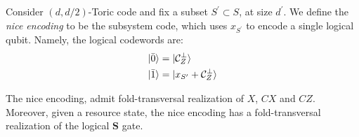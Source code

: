 \begin{definition}
  Consider $(d,d/2)$-Toric code and fix a subset $S^{\prime} \subset S$, at size $d^{\prime}$. We define the \textit{nice encoding} to be the subsystem code, which uses $x_{S^{\prime}}$ to encode a single logical qubit. Namely, the logical codewords are: 
  \begin{equation*}
    \begin{split}
      \ket{ \bar{0} } &= \ket{ \mathcal{C}_{Z}^{\perp} } \\ 
      \ket{ \bar{1} } &= \ket{ x_{S^{\prime}} + \mathcal{C}_{Z}^{\perp} } 
    \end{split}
  \end{equation*}
\end{definition}
\begin{claim}
  The nice encoding, admit fold-transversal realization of $X$, $CX$ and $CZ$. Moreover, given a resource state, the nice encoding has a fold-transversal realization of the logical $\mathbf{S}$ gate. 
\end{claim}
